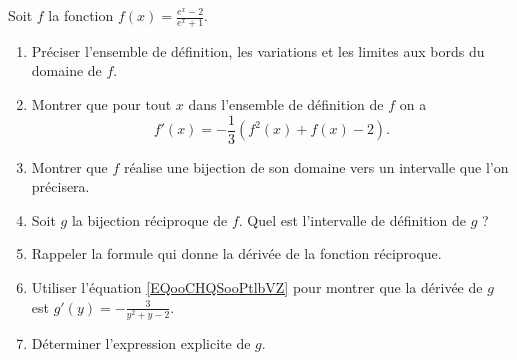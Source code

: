 

\begin{exercice}\label{exomazhe-0017}

Soit $f$ la fonction $\displaystyle f(x) = \frac{e^x - 2}{e^x+1}$. 
\begin{enumerate}
\item Préciser l'ensemble de définition, les variations et les limites aux bords du domaine de $f$.
\item Montrer que pour tout $x$ dans l'ensemble de définition de $f$ on a 
  \begin{equation} \label{EQooCHQSooPtlbVZ}
    f'(x) = -\frac{1}{3}\left(f^2(x) + f(x)-2\right).
  \end{equation}
\item Montrer que $f$ réalise une bijection de son domaine vers un intervalle que l'on précisera.
\item Soit $g$ la bijection réciproque de $f$. Quel est l'intervalle de définition de $g$ ? 
\item Rappeler la formule qui donne la dérivée de la fonction réciproque.
\item Utiliser l'équation \eqref{EQooCHQSooPtlbVZ} pour montrer que la dérivée de $g$ est $g'(y)=-\frac{3}{y^2+y-2}$.
\item Déterminer l'expression explicite de $g$. 
\end{enumerate}


\end{exercice}
